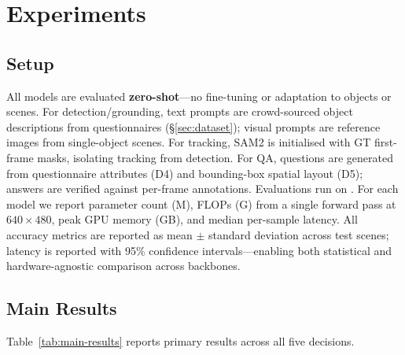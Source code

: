 \section{Experiments}\label{sec:experiments}

\subsection{Setup}

All models are evaluated \textbf{zero-shot}---no fine-tuning or adaptation to \coolname{} objects or scenes.
For detection/grounding, text prompts are crowd-sourced object descriptions from questionnaires (\S\ref{sec:dataset}); visual prompts are reference images from single-object scenes.
For tracking, SAM2 is initialised with GT first-frame masks, isolating tracking from detection.
For QA, questions are generated from questionnaire attributes (D4) and bounding-box spatial layout (D5); answers are verified against per-frame annotations.
Evaluations run on .
For each model we report parameter count (M), FLOPs (G) from a single forward pass at $640\!\times\!480$, peak GPU memory (GB), and median per-sample latency.
All accuracy metrics are reported as mean $\pm$ standard deviation across test scenes; latency is reported with 95\% confidence intervals---enabling both statistical and hardware-agnostic comparison across backbones.

\subsection{Main Results}

Table~\ref{tab:main-results} reports primary results across all five decisions.

